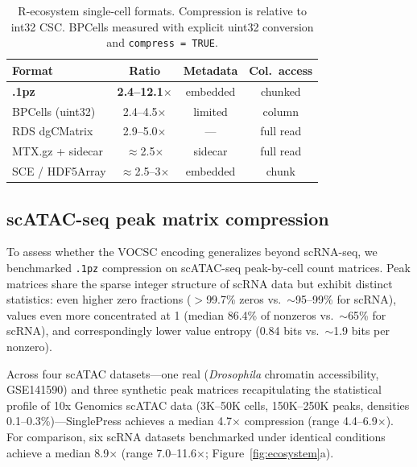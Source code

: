 \documentclass[10pt,twocolumn,letterpaper]{article}
\begin{document}
\begin{table}[t]
\centering
\caption{R-ecosystem single-cell formats. Compression is relative to int32 CSC. BPCells measured with explicit uint32 conversion and \texttt{compress = TRUE}.}
\label{tab:rformats}
\footnotesize
\begin{tabular}{l c c c}
\toprule
Format & Ratio & Metadata & Col.\ access \\
\midrule
\textbf{.1pz}          & \textbf{2.4--12.1}$\times$ & embedded & chunked \\
BPCells (uint32)        & 2.4--4.5$\times$ & limited & column \\
RDS dgCMatrix           & 2.9--5.0$\times$ & --- & full read \\
MTX.gz + sidecar        & $\approx$2.5$\times$ & sidecar & full read \\
SCE / HDF5Array         & $\approx$2.5--3$\times$ & embedded & chunk \\
\bottomrule
\end{tabular}
\end{table}

\subsection{scATAC-seq peak matrix compression}

To assess whether the VOCSC encoding generalizes beyond scRNA-seq, we benchmarked \texttt{.1pz} compression on scATAC-seq peak-by-cell count matrices.
Peak matrices share the sparse integer structure of scRNA data but exhibit distinct statistics: even higher zero fractions ($>$99.7\% zeros vs.\ $\sim$95--99\% for scRNA), values even more concentrated at 1 (median 86.4\% of nonzeros vs.\ $\sim$65\% for scRNA), and correspondingly lower value entropy (0.84 bits vs.\ $\sim$1.9 bits per nonzero).

Across four scATAC datasets---one real (\textit{Drosophila} chromatin accessibility, GSE141590) and three synthetic peak matrices recapitulating the statistical profile of 10x Genomics scATAC data (3K--50K cells, 150K--250K peaks, densities 0.1--0.3\%)---SinglePress achieves a median 4.7$\times$ compression (range 4.4--6.9$\times$).
For comparison, six scRNA datasets benchmarked under identical conditions achieve a median 8.9$\times$ (range 7.0--11.6$\times$; Figure~\ref{fig:ecosystem}a).
\end{document}

